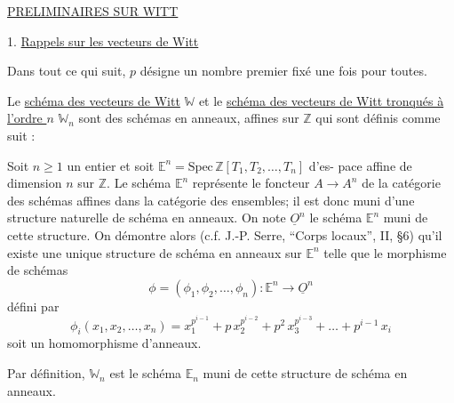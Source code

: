 \uline{PRELIMINAIRES SUR WITT}

1. \uline{Rappels sur les vecteurs de Witt}

Dans tout ce qui suit, $p$ désigne un nombre premier fixé une
fois pour toutes.

Le \uline{schéma des vecteurs de Witt} $\mathbb{W}$ et le \uline{schéma des vecteurs
de Witt tronqués à l'ordre $n$} $\mathbb{W}_n$ sont des schémas en anneaux, affines
sur $\mathbb{Z}$ qui sont définis comme suit :

Soit $n \geq 1$ un entier et soit $\mathbb{E}^n = \mathrm{Spec}\, \mathbb{Z}[T_1,T_2,\dots,T_n]$ d'es-%
pace affine de dimension $n$ sur $\mathbb{Z}$. Le schéma $\mathbb{E}^n$ représente le foncteur
$A \to A^n$ de la catégorie des schémas affines dans la catégorie des ensembles;
il est donc muni d'une structure naturelle de schéma en anneaux. On note
$\underline{O}^n$ le schéma $\mathbb{E}^n$ muni de cette structure. On démontre alors (c.f. J.-P.
Serre, ``Corps locaux'', II, §6) qu'il existe une unique structure de schéma
en anneaux sur $\mathbb{E}^n$ telle que le morphisme de schémas
\[ \phi = (\phi_1,\phi_2,\dots,\phi_n) : \mathbb{E}^n \to \underline{O}^n \]
défini par
\[ \phi_i(x_1,x_2,\dots,x_n) = x_1^{p^{i-1}} + p\, x_2^{p^{i-2}} + p^2\, x_3^{p^{i-3}} + \dots + p^{i-1}\, x_i \]
soit un homomorphisme d'anneaux.

Par définition, $\mathbb{W}_n$ est le schéma $\mathbb{E}_n$ muni de cette structure
de schéma en anneaux.

